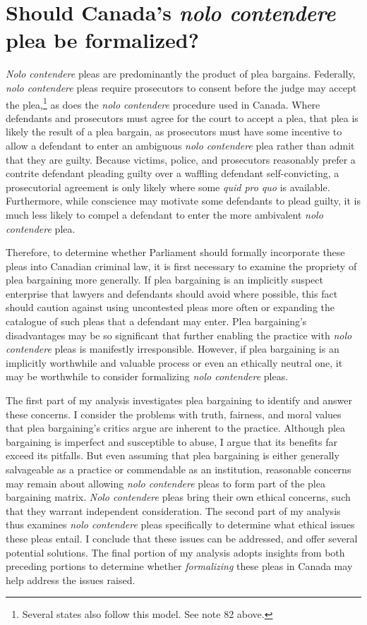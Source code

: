\chapter{Should Canada's \textit{nolo contendere} plea be formalized?}

\setcounter{footnote}{147}

\textit{Nolo contendere} pleas are predominantly the product of plea bargains. Federally, \textit{nolo contendere} pleas require prosecutors to consent before the judge may accept the plea,\footnote{Several states also follow this model. See note 82 above.} as does the \textit{nolo contendere} procedure used in Canada. Where defendants and prosecutors must agree for the court to accept a plea, that plea is likely the result of a plea bargain, as prosecutors must have some incentive to allow a defendant to enter an ambiguous \textit{nolo contendere} plea rather than admit that they are guilty. Because victims, police, and prosecutors reasonably prefer a contrite defendant pleading guilty over a waffling defendant self-convicting, a prosecutorial agreement is only likely where some \textit{quid pro quo} is available. Furthermore, while conscience may motivate some defendants to plead guilty, it is much less likely to compel a defendant to enter the more ambivalent \textit{nolo contendere} plea.

Therefore, to determine whether Parliament should formally incorporate these pleas into Canadian criminal law, it is first necessary to examine the propriety of plea bargaining more generally. If plea bargaining is an implicitly suspect enterprise that lawyers and defendants should avoid where possible, this fact should caution against using uncontested pleas more often or expanding the catalogue of such pleas that a defendant may enter. Plea bargaining's disadvantages may be so significant that further enabling the practice with \textit{nolo contendere} pleas is manifestly irresponsible. However, if plea bargaining is an implicitly worthwhile and valuable process or even an ethically neutral one, it may be worthwhile to consider formalizing \textit{nolo contendere} pleas.

The first part of my analysis investigates plea bargaining to identify and answer these concerns. I consider the problems with truth, fairness, and moral values that plea bargaining's critics argue are inherent to the practice. Although plea bargaining is imperfect and susceptible to abuse, I argue that its benefits far exceed its pitfalls. But even assuming that plea bargaining is either generally salvageable as a practice or commendable as an institution, reasonable concerns may remain about allowing \textit{nolo contendere} pleas to form part of the plea bargaining matrix. \textit{Nolo contendere} pleas bring their own ethical concerns, such that they warrant independent consideration. The second part of my analysis thus examines \textit{nolo contendere} pleas specifically to determine what ethical issues these pleas entail. I conclude that these issues can be addressed, and offer several potential solutions. The final portion of my analysis adopts insights from both preceding portions to determine whether \textit{formalizing} these pleas in Canada may help address the issues raised.